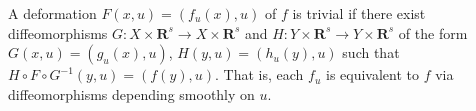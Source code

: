 A deformation $F(x, u) = (f_u(x), u)$ of $f$ is trivial if there exist diffeomorphisms $G: X \times \mathbf{R}^s \to X \times \mathbf{R}^s$ and $H: Y \times \mathbf{R}^s \to Y \times \mathbf{R}^s$ of the form $G(x, u) = (g_u(x), u)$, $H(y, u) = (h_u(y), u)$ such that $H \circ F \circ G^{-1}(y, u) = (f(y), u)$. That is, each $f_u$ is equivalent to $f$ via diffeomorphisms depending smoothly on $u$.
